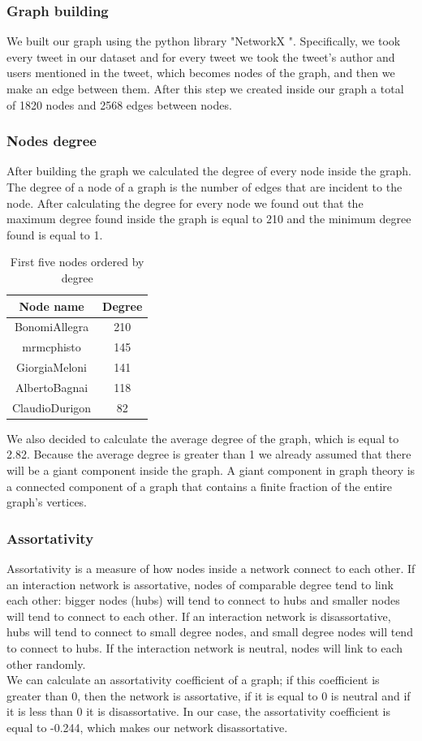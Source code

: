 \documentclass[12pt,journal,compsoc]{IEEEtran}
\begin{document}
\subsubsection{Graph building}
We built our graph using the python library "NetworkX \cite{NetworkX}". Specifically, we took every tweet in our dataset and for every tweet we took the tweet's author and users mentioned in the tweet, which becomes nodes of the graph, and then we make an edge between them. After this step we created inside our graph a total of 1820 nodes and 2568 edges between nodes.

\subsubsection{Nodes degree}
After building the graph we calculated the degree of every node inside the graph. The degree of a node of a graph is the number of edges that are incident to the node. After calculating the degree for every node we found out that the maximum degree found inside the graph is equal to 210 and the minimum degree found is equal to 1.

\begin{table}[ht]
\centering
\begin{tabular}{c c }
	Node name & Degree  \\
	\hline
	BonomiAllegra & 210  \\
	mrmcphisto & 145  \\
	GiorgiaMeloni & 141  \\
	AlbertoBagnai & 118  \\
	ClaudioDurigon & 82  \\
\end{tabular}
\caption{First five nodes ordered by degree}
\end{table}

We also decided to calculate the average degree of the graph, which is equal to 2.82. Because the average degree is greater than 1 we already assumed that there will be a giant component inside the graph. A giant component in graph theory is a connected component of a graph that contains a finite fraction of the entire graph's vertices.

\subsubsection{Assortativity}
Assortativity is a measure of how nodes inside a network connect to each other. If an interaction network is assortative, nodes of comparable degree tend to link each other: bigger nodes (hubs) will tend to connect to hubs and smaller nodes will tend to connect to each other. If an interaction network is disassortative, hubs will tend to connect to small degree nodes, and small degree nodes will tend to connect to hubs. If the interaction network is neutral, nodes will link to each other randomly.\\
We can calculate an assortativity coefficient of a graph; if this coefficient is greater than 0, then the network is assortative, if it is equal to 0 is neutral and if it is less than 0 it is disassortative.
In our case, the assortativity coefficient is equal to -0.244, which makes our network disassortative.
\end{document}
